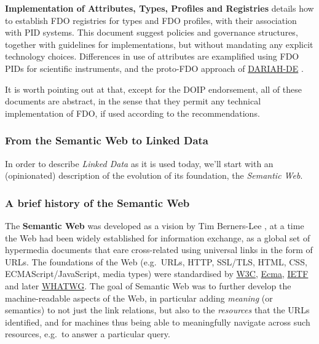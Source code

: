\textbf{Implementation of Attributes, Types, Profiles and Registries} \cite{fdo-ImplAttributesTypesProfiles} details how to establish FDO registries for types and FDO profiles, with their association with PID systems. This document suggest policies and governance structures, together with guidelines for implementations, but without mandating any explicit technology choices. Differences in use of attributes are examplified using FDO PIDs for scientific instruments, and the proto-FDO approach of \href{https://de.dariah.eu/}{DARIAH-DE} \cite{schwardmannTwoExamplesHow2022}.

It is worth pointing out at that, except for the DOIP endorsement, all of these documents are abstract, in the sense that they permit any technical implementation of FDO, if used according to the recommendations.

\hypertarget{ch3:ld}{%
\subsubsection{From the Semantic Web to Linked Data}\label{ch3:ld}}

In order to describe \emph{Linked Data} as it is used today, we'll start with an (opinionated) description of the evolution of its foundation, the \emph{Semantic Web}.

\hypertarget{ch3:semweb}{%
\subsubsection{A brief history of the Semantic Web}\label{ch3:semweb}}

The \textbf{Semantic Web} was developed as a vision by Tim Berners-Lee \cite{berners-leeWeavingWebOriginal1999}, at a time the Web had been widely established for information exchange, as a global set of hypermedia documents that eare cross-related using universal links in the form of URLs. The foundations of the Web (e.g.~URLs, HTTP, SSL/TLS, HTML, CSS, ECMAScript/JavaScript, media types) were standardised by \href{https://www.w3.org/standards/}{W3C}, \href{https://www.ecma-international.org/}{Ecma}, \href{https://www.ietf.org/standards/}{IETF} and later \href{https://whatwg.org/}{WHATWG}. The goal of Semantic Web was to further develop the machine-readable aspects of the Web, in particular adding \emph{meaning} (or semantics) to not just the link relations, but also to the \emph{resources} that the URLs identified, and for machines thus being able to meaningfully navigate across such resources, e.g.~to answer a particular query.

